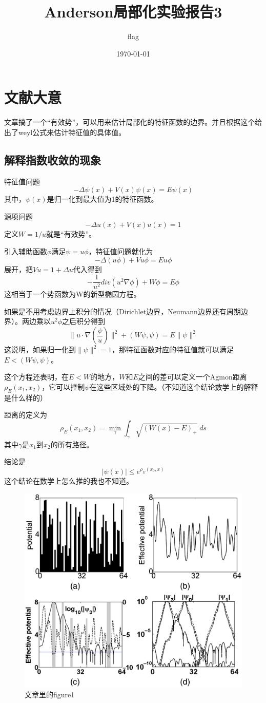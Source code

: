 \documentclass[UTF8,12pt]{article}
\title{Anderson局部化实验报告3}
\author{flag}
\date{\today}
\begin{document}
    
\maketitle

\section{文献大意}

文章搞了一个“有效势”，可以用来估计局部化的特征函数的边界。并且根据这个给出了weyl公式来估计特征值的具体值。

\subsection{解释指数收敛的现象}

特征值问题
$$ - \Delta \psi(x) + V(x) \psi(x) = E \psi(x) $$
其中，$\psi(x)$是归一化到最大值为1的特征函数。

源项问题
$$ - \Delta u(x) + V(x) u(x) = 1 $$
定义$W = 1/u$就是“有效势”。

引入辅助函数$\phi$满足$\psi = u \phi$，特征值问题就化为
$$ - \Delta (u \phi) + V u \phi = E u \phi $$
展开，把$V u = 1 + \Delta u$代入得到
$$ - \frac{1}{u^2} div(u^2 \nabla \phi) + W \phi = E \phi $$
这相当于一个势函数为W的新型椭圆方程。

如果是不用考虑边界上积分的情况（Dirichlet边界，Neumann边界还有周期边界）。两边乘以$u^2 \phi$之后积分得到
$$ \|u \cdot \nabla (\frac{\psi}{u})\|^2 + (W \psi, \psi) = E \|\psi\|^2 $$
这说明，如果归一化到$\|\psi\|^2 = 1$，那特征函数对应的特征值就可以满足$E < (W \psi, \psi)$。

这个方程还表明，在$E < W$的地方，$W$和$E$之间的差可以定义一个Agmon距离$\rho_E(x_1, x_2)$，它可以控制$\psi$在这些区域处的下降。（不知道这个结论数学上的解释是什么样的）

距离的定义为
$$ \rho_E(x_1, x_2) = \min_\gamma \int_\gamma \sqrt{(W(x)-E)_+} \; ds $$
其中$\gamma$是$x_1$到$x_2$的所有路径。

结论是
$$ |\psi(x)| \leqslant e^{\rho_E(x_0, x)} $$
这个结论在数学上怎么推的我也不知道。

\begin{figure}[htbp]
\centering
\includegraphics[width=0.7\linewidth]{article1}
\caption{文章里的figure1}
\label{article1}
\end{figure}
\end{document}
